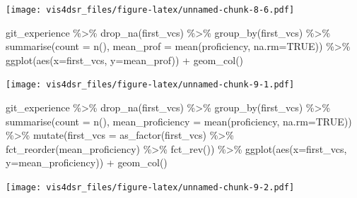 \documentclass[
]{krantz}
\makeatletter
\newenvironment{Shaded}{\begin{snugshade}}{\end{snugshade}}
\newcommand{\AttributeTok}[1]{\textcolor[rgb]{0.61,0.61,0.61}{#1}}
\newcommand{\ConstantTok}[1]{\textcolor[rgb]{0,0,0}{#1}}
\newcommand{\FunctionTok}[1]{\textcolor[rgb]{0,0,0}{#1}}
\newcommand{\NormalTok}[1]{#1}
\newcommand{\SpecialCharTok}[1]{\textcolor[rgb]{0,0,0}{#1}}
\newenvironment{kframe}{%
\medskip{}
\setlength{\fboxsep}{.8em}
 \def\at@end@of@kframe{}%
 \ifinner\ifhmode%
  \def\at@end@of@kframe{\end{minipage}}%
  \begin{minipage}{\columnwidth}%
 \fi\fi%
 \def\FrameCommand##1{\hskip\@totalleftmargin \hskip-\fboxsep
 \colorbox{shadecolor}{##1}\hskip-\fboxsep
     \hskip-\linewidth \hskip-\@totalleftmargin \hskip\columnwidth}%
 \MakeFramed {\advance\hsize-\width
   \@totalleftmargin\z@ \linewidth\hsize
   \@setminipage}}%
 {\par\unskip\endMakeFramed%
 \at@end@of@kframe}
\renewenvironment{Shaded}{\begin{kframe}}{\end{kframe}}
\makeatother
\begin{document}
\texttt{[image: vis4dsr\_files/figure-latex/unnamed-chunk-8-6.pdf]}

\begin{Shaded}
\begin{Highlighting}[]
\NormalTok{git\_experience }\SpecialCharTok{\%\textgreater{}\%} \FunctionTok{drop\_na}\NormalTok{(first\_vcs) }\SpecialCharTok{\%\textgreater{}\%}
  \FunctionTok{group\_by}\NormalTok{(first\_vcs) }\SpecialCharTok{\%\textgreater{}\%} 
  \FunctionTok{summarise}\NormalTok{(}\AttributeTok{count =} \FunctionTok{n}\NormalTok{(), }\AttributeTok{mean\_prof =} \FunctionTok{mean}\NormalTok{(proficiency, }\AttributeTok{na.rm=}\ConstantTok{TRUE}\NormalTok{)) }\SpecialCharTok{\%\textgreater{}\%}
  \FunctionTok{ggplot}\NormalTok{(}\FunctionTok{aes}\NormalTok{(}\AttributeTok{x=}\NormalTok{first\_vcs, }\AttributeTok{y=}\NormalTok{mean\_prof)) }\SpecialCharTok{+}
    \FunctionTok{geom\_col}\NormalTok{()}
\end{Highlighting}
\end{Shaded}

\texttt{[image: vis4dsr\_files/figure-latex/unnamed-chunk-9-1.pdf]}

\begin{Shaded}
\begin{Highlighting}[]
\NormalTok{git\_experience }\SpecialCharTok{\%\textgreater{}\%} 
  \FunctionTok{drop\_na}\NormalTok{(first\_vcs) }\SpecialCharTok{\%\textgreater{}\%}
  \FunctionTok{group\_by}\NormalTok{(first\_vcs) }\SpecialCharTok{\%\textgreater{}\%} 
  \FunctionTok{summarise}\NormalTok{(}\AttributeTok{count =} \FunctionTok{n}\NormalTok{(), }\AttributeTok{mean\_proficiency =} \FunctionTok{mean}\NormalTok{(proficiency, }\AttributeTok{na.rm=}\ConstantTok{TRUE}\NormalTok{)) }\SpecialCharTok{\%\textgreater{}\%}
  \FunctionTok{mutate}\NormalTok{(}\AttributeTok{first\_vcs =} \FunctionTok{as\_factor}\NormalTok{(first\_vcs) }\SpecialCharTok{\%\textgreater{}\%} 
           \FunctionTok{fct\_reorder}\NormalTok{(mean\_proficiency) }\SpecialCharTok{\%\textgreater{}\%} \FunctionTok{fct\_rev}\NormalTok{()) }\SpecialCharTok{\%\textgreater{}\%}
  \FunctionTok{ggplot}\NormalTok{(}\FunctionTok{aes}\NormalTok{(}\AttributeTok{x=}\NormalTok{first\_vcs, }\AttributeTok{y=}\NormalTok{mean\_proficiency)) }\SpecialCharTok{+}
    \FunctionTok{geom\_col}\NormalTok{()}
\end{Highlighting}
\end{Shaded}

\texttt{[image: vis4dsr\_files/figure-latex/unnamed-chunk-9-2.pdf]}
\end{document}
